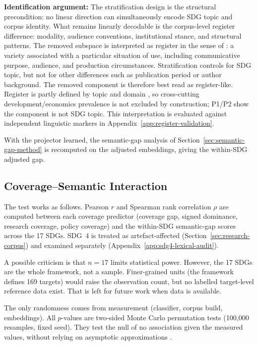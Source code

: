 \documentclass[12pt,a4paper]{article}
\begin{document}
   \textbf{Identification argument:} The stratification design is the structural precondition: no linear direction can simultaneously encode SDG topic and corpus identity. What remains linearly decodable is the corpus-level register difference: modality, audience conventions, institutional stance, and structural patterns. The removed subspace is interpreted as register in the sense of \textcite{biberConrad2009register}: a variety associated with a particular situation of use, including communicative purpose, audience, and production circumstances. Stratification controls for SDG topic, but not for other differences such as publication period or author background. The removed component is therefore best read as register-like. Register is partly defined by topic and domain \parencite{Grieve2025}, so cross-cutting development/economics prevalence is not excluded by construction; P1/P2 show the component is not SDG topic. This interpretation is evaluated against independent linguistic markers in Appendix~\ref{app:register-validation}.

 With the projector learned, the semantic-gap analysis of Section~\ref{sec:semantic-gap-method} is recomputed on the adjusted embeddings, giving the within-SDG adjusted gap.

\subsection{Coverage--Semantic Interaction}\label{sec:coverage-semantic-interaction}

The test works as follows. Pearson $r$ and Spearman rank correlation $\rho$ are computed between each coverage predictor (coverage gap, signed dominance, research coverage, policy coverage) and the within-SDG semantic-gap scores across the 17 SDGs. SDG~4 is treated as artefact-affected (Section~\ref{sec:research-corpus}) and examined separately (Appendix~\ref{app:sdg4-lexical-audit}).

A possible criticism is that $n = 17$ limits statistical power. However, the 17 SDGs are the whole framework, not a sample. Finer-grained units (the framework defines 169 targets) would raise the observation count, but no labelled target-level reference data exist. That is left for future work when data is available.

The only randomness comes from measurement (classifier, corpus build, embeddings). All $p$-values are two-sided Monte Carlo permutation tests (100,000 resamples, fixed seed). They test the null of no association given the measured values, without relying on asymptotic approximations \parencite{BerkWesternWeiss1995, AbadieAtheyImbensWooldridge2020}.
\end{document}
